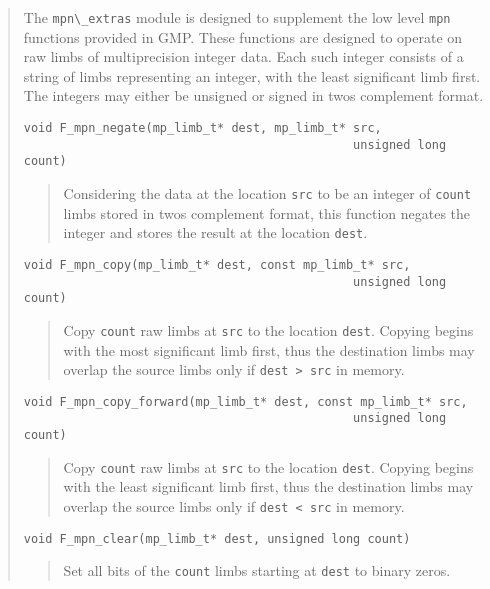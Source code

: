 \documentclass[a4paper,10pt]{article}
\newcommand{\code}{\lstinline}
\begin{document}
\begin{quote}
The \code{mpn\_extras} module is designed to supplement the low level \code{mpn} functions provided in GMP. These functions are designed to operate on raw limbs of multiprecision integer data. Each such integer consists of a string of limbs representing an integer, with the least significant limb first. The integers may either be unsigned or signed in twos complement format.

\begin{lstlisting}
void F_mpn_negate(mp_limb_t* dest, mp_limb_t* src, 
                                              unsigned long count)
\end{lstlisting}
\begin{quote}
Considering the data at the location \code{src} to be an integer of \code{count} limbs stored in twos complement format, this function negates the integer and stores the result at the location \code{dest}.
\end{quote}

\begin{lstlisting}
void F_mpn_copy(mp_limb_t* dest, const mp_limb_t* src, 
                                              unsigned long count)
\end{lstlisting}
\begin{quote}
Copy \code{count} raw limbs at \code{src} to the location \code{dest}. Copying begins with the most significant limb first, thus the destination limbs may overlap the source limbs only if \code{dest > src} in memory.
\end{quote}

\begin{lstlisting}
void F_mpn_copy_forward(mp_limb_t* dest, const mp_limb_t* src,  
                                              unsigned long count)
\end{lstlisting}
\begin{quote}
Copy \code{count} raw limbs at \code{src} to the location \code{dest}. Copying begins with the least significant limb first, thus the destination limbs may overlap the source limbs only if \code{dest < src} in memory.
\end{quote}

\begin{lstlisting}
void F_mpn_clear(mp_limb_t* dest, unsigned long count)
\end{lstlisting}
\begin{quote}
Set all bits of the \code{count} limbs starting at \code{dest} to binary zeros.
\end{quote}


\end{quote}
\end{document}
